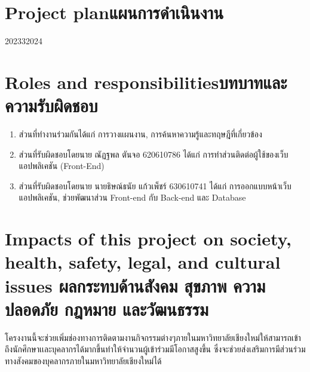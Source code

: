 \section{\ifenglish Project plan\else แผนการดำเนินงาน\fi}

\begin{plan}{10}{2023}{3}{2024}

\end{plan}

\section{\ifenglish Roles and responsibilities\else บทบาทและความรับผิดชอบ\fi}
\begin{enumerate}
    \item ส่วนที่ทำงานร่วมกันได้แก่ การวางแผนงาน, การค้นหาความรู้และทฤษฎีที่เกี่ยวข้อง
    \item ส่วนที่รับผิดชอบโดยนาย ณัฏฐพล ตันจอ 620610786 ได้แก่ การทำส่วนติดต่อผู้ใช้ของเว็บแอปพลิเคชัน (Front-End)
    \item ส่วนที่รับผิดชอบโดยนาย นายธิษณ์ธนัย แก้วเพ็ชร์ 630610741 ได้แก่ การออกแบบหน้าเว็บแอปพลิเคชัน, ช่วยพัฒนาส่วน Front-end กับ Back-end และ Database 
\end{enumerate}

\section{\ifenglish%
Impacts of this project on society, health, safety, legal, and cultural issues
\else%
ผลกระทบด้านสังคม สุขภาพ ความปลอดภัย กฎหมาย และวัฒนธรรม
\fi}

โครงงานนี้จะช่วยเพิ่มช่องทางการติดตามงานกิจกรรมต่างๆภายในมหาวิทยาลัยเชียงใหม่ให้สามารถเข้าถึงนักศึกษาเเละบุคลากรได้มากขึ้นทำให้จำนวนผู้เข้าร่วมมีโอกาสสูงขึ้น ซึ่งจะช่วยส่งเสริมการมีส่วนร่วมทางสังคมของบุคลากรภายในมหาวิทยาลัยเชียงใหม่ได้